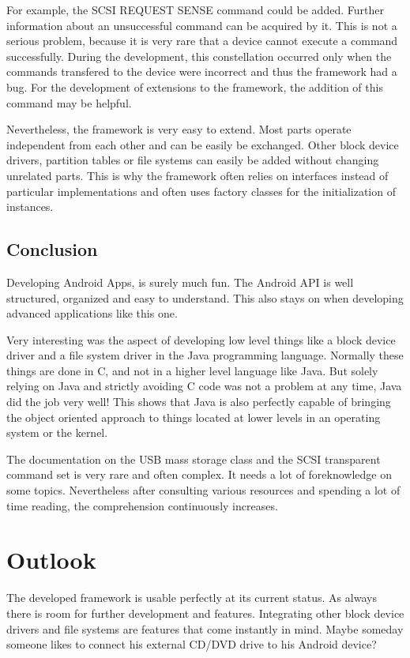 For example, the SCSI REQUEST SENSE command could be added. Further information about an unsuccessful command can be acquired by it. This is not a serious problem, because it is very rare that a device cannot execute a command successfully. During the development, this constellation occurred only when the commands transfered to the device were incorrect and thus the framework had a bug. For the development of extensions to the framework, the addition of this command may be helpful.

Nevertheless, the framework is very easy to extend. Most parts operate independent from each other and can be easily be exchanged. Other block device drivers, partition tables or file systems can easily be added without changing unrelated parts. This is why the framework often relies on interfaces instead of particular implementations and often uses factory classes for the initialization of instances.

\section{Conclusion}

Developing Android Apps, is surely much fun. The Android API is well structured, organized and easy to understand. This also stays on when developing advanced applications like this one. 

Very interesting was the aspect of developing low level things like a block device driver and a file system driver in the Java programming language. Normally these things are done in C, and not in a higher level language like Java. But solely relying on Java and strictly avoiding C code was not a problem at any time, Java did the job very well! This shows that Java is also perfectly capable of bringing the object oriented approach to things located at lower levels in an operating system or the kernel.

The documentation on the USB mass storage class and the SCSI transparent command set is very rare and often complex. It needs a lot of foreknowledge on some topics. Nevertheless after consulting various resources and spending a lot of time reading, the comprehension continuously increases.

\chapter{Outlook}

The developed framework is usable perfectly at its current status. As always there is room for further development and features. Integrating other block device drivers and file systems are features that come instantly in mind. Maybe someday someone likes to connect his external CD/DVD drive to his Android device?

